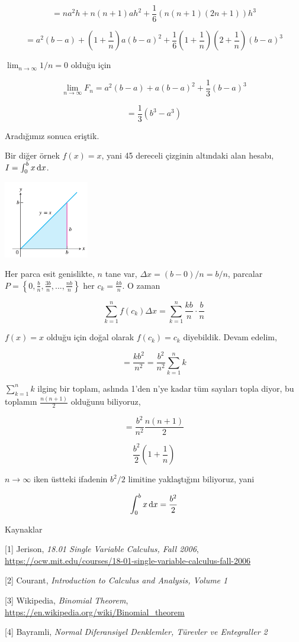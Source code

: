\documentclass[12pt,fleqn]{article}\usepackage{../../common}
\begin{document}
$$
= na^2h + n(n+1)ah^2 + \frac{1}{6} (n(n+1)(2n+1))h^3
$$

$$
= a^2 (b-a) + (1+\frac{1}{n})a (b-a)^2 +
  \frac{1}{6} (1+\frac{1}{n})(2+\frac{1}{n})(b-a)^3
$$

$\lim_{n\to\infty} 1/n = 0$ olduğu için

$$
\lim_{n\to\infty} F_n = a^2(b-a) + a(b-a)^2 + \frac{1}{3} (b-a)^3 
$$

$$
= \frac{1}{3} (b^3 - a^3)
$$

Aradığımız sonuca eriştik.

Bir diğer örnek $f(x) = x$, yani 45 dereceli çizginin altındaki alan hesabı,
$I = \int_{0}^{b} x \,\mathrm{d} x$.

\includegraphics[width=10em]{ode_mattuck_94_int_01.png}

Her parca esit genislikte, $n$ tane var, $\Delta x = (b - 0) / n = b/n$,
parcalar $P = \left\{ 0, \frac{b}{n}, \frac{3b}{n}, ..., \frac{nb}{n}
\right\}$ her $c_k = \frac{kb}{n}$. O zaman 

$$ 
\sum_{k=1}^{n} f(c_k) \Delta x = \sum_{k=1}^{n} \frac{kb}{n} \cdot \frac{b}{n}
$$

$f(x) = x$ olduğu için doğal olarak $f(c_k)=c_k$ diyebildik. Devam edelim, 

$$ 
= \frac{kb^2}{n^2} = \frac{b^2}{n^2} \sum_{k=1}^{n} k
$$

$\sum_{k=1}^{n} k$ ilginç bir toplam, aslında 1'den n'ye kadar tüm
sayıları topla diyor, bu toplamın $\frac{n(n+1)}{2}$ olduğunu biliyoruz, 

$$ 
= \frac{b^2}{n^2} \frac{n(n+1)}{2}
$$

$$ 
\frac{b^2}{2} (1 + \frac{1}{n})
$$

$n \to \infty$ iken üstteki ifadenin $b^2/2$ limitine yaklaştığını
biliyoruz, yani

$$ 
\int_{0}^{b} x \,\mathrm{d} x = \frac{b^2}{2}
$$


Kaynaklar

[1] Jerison, {\em 18.01 Single Variable Calculus, Fall 2006},
    \url{https://ocw.mit.edu/courses/18-01-single-variable-calculus-fall-2006}

[2] Courant, {\em Introduction to Calculus and Analysis, Volume 1}

[3] Wikipedia, {\em Binomial Theorem},
    \url{https://en.wikipedia.org/wiki/Binomial_theorem}

[4] Bayramli, {\em Normal Diferansiyel Denklemler, Türevler ve Entegraller 2}
    
\end{document}
